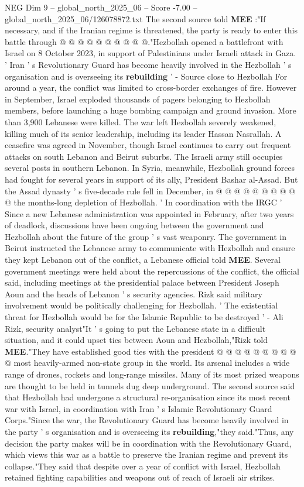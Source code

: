 \begin{textsample}{NEG Dim 9 – global\_north\_2025\_06 – Score -7.00 – global\_north\_2025\_06/126078872.txt}
The second source told \textbf{MEE} :"If necessary, and if the Iranian regime is threatened, the party is ready to enter this battle through @ @ @ @ @ @ @ @ @ @."Hezbollah opened a battlefront with Israel on 8 October 2023, in support of Palestinians under Israeli attack in Gaza. ' Iran ' s Revolutionary Guard has become heavily involved in the Hezbollah ' s organisation and is overseeing its \textbf{rebuilding} ' - Source close to Hezbollah For around a year, the conflict was limited to cross-border exchanges of fire.
However in September, Israel exploded thousands of pagers belonging to Hezbollah members, before launching a huge bombing campaign and ground invasion.
More than 3,900 Lebanese were killed.
The war left Hezbollah severely weakened, killing much of its senior leadership, including its leader Hassan Nasrallah.
A ceasefire was agreed in November, though Israel continues to carry out frequent attacks on south Lebanon and Beirut suburbs.
The Israeli army still occupies several posts in southern Lebanon.
In Syria, meanwhile, Hezbollah ground forces had fought for several years in support of its ally, President Bashar al-Assad.
But the Assad dynasty ' s five-decade rule fell in December, in @ @ @ @ @ @ @ @ @ @ the months-long depletion of Hezbollah. ' In coordination with the IRGC ' Since a new Lebanese administration was appointed in February, after two years of deadlock, discussions have been ongoing between the government and Hezbollah about the future of the group ' s vast weaponry.
The government in Beirut instructed the Lebanese army to communicate with Hezbollah and ensure they kept Lebanon out of the conflict, a Lebanese official told \textbf{MEE}.
Several government meetings were held about the repercussions of the conflict, the official said, including meetings at the presidential palace between President Joseph Aoun and the heads of Lebanon ' s security agencies.
Rizk said military involvement would be politically challenging for Hezbollah. ' The existential threat for Hezbollah would be for the Islamic Republic to be destroyed ' - Ali Rizk, security analyst"It ' s going to put the Lebanese state in a difficult situation, and it could upset ties between Aoun and Hezbollah,"Rizk told \textbf{MEE}."They have established good ties with the president @ @ @ @ @ @ @ @ @ @ most heavily-armed non-state group in the world.
Its arsenal includes a wide range of drones, rockets and long-range missiles.
Many of its most prized weapons are thought to be held in tunnels dug deep underground.
The second source said that Hezbollah had undergone a structural re-organisation since its most recent war with Israel, in coordination with Iran ' s Islamic Revolutionary Guard Corps."Since the war, the Revolutionary Guard has become heavily involved in the party ' s organisation and is overseeing its \textbf{rebuilding},"they said."Thus, any decision the party makes will be in coordination with the Revolutionary Guard, which views this war as a battle to preserve the Iranian regime and prevent its collapse."They said that despite over a year of conflict with Israel, Hezbollah retained fighting capabilities and weapons out of reach of Israeli air strikes.

\end{textsample}

